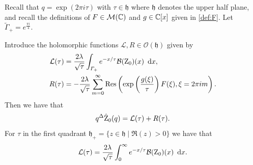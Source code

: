 Recall that $q=\exp(2 \pi i \tau)$ with $\tau \in \mathfrak{h}$ where $\mathfrak{h}$ denotes the upper half plane, and recall the definitions of $F \in \mathcal{M}(\mathbb{C})$ and $g \in \mathbb{C}[x]$ given in \eqref{def:F}. Let $\tilde\Gamma_+ = e^{\frac{\pi i}{4}}$.
\begin{lemma} \label{Lemmaet}
Introduce the holomorphic functions $\mathcal{L},R \in \mathcal{O}(\mathfrak{h})$ given by
	\begin{align}
	\mathcal{L}(\tau) &= \frac{2\lambda}{\sqrt{\tau}} \int_{\varGamma_+} e^{-x /\tau} \mathcal{B}(\operatorname{Z}_0)(x) \ \operatorname{{d}\hskip-.6mm} x,
	\\  R(\tau) &= -\frac{2 \lambda} {\sqrt{\tau} } \sum_{m=0 }^{\infty}  \operatorname{Res}\left( \exp\left( \frac{g(\xi)}{\tau}\right) F(\xi) ,\xi= 2 \pi i m\right).
	\end{align}
	Then we have that
	\begin{equation} \label{eq:sumoftwoparts}
	q^{\Delta}\hat{\operatorname{Z}}_0(q)= \mathcal{L}(\tau)+R(\tau).
	\end{equation}
	For $\tau$   in the first quadrant $ \mathfrak{h}_+ = \{z\in \mathfrak{h} \mid \Re(z) >0\}$ we have that
	\begin{equation} \label{eq:DEDEFORMATION}
		\mathcal{L}(\tau) = \frac{2\lambda}{\sqrt{\tau}} \int_{0}^{\infty} e^{-x /\tau} \mathcal{B}(\operatorname{Z}_0)(x) \ \operatorname{{d}\hskip-.6mm} x.
	\end{equation}
	
\end{lemma}


